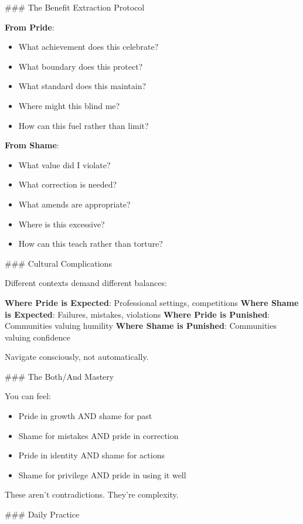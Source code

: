 \documentclass[12pt]{book}
\begin{document}
\#\#\# The Benefit Extraction Protocol

\textbf{From Pride}:
\begin{itemize}
\item What achievement does this celebrate?
\item What boundary does this protect?
\item What standard does this maintain?
\item Where might this blind me?
\item How can this fuel rather than limit?

\end{itemize}
\textbf{From Shame}:
\begin{itemize}
\item What value did I violate?
\item What correction is needed?
\item What amends are appropriate?
\item Where is this excessive?
\item How can this teach rather than torture?

\end{itemize}
\#\#\# Cultural Complications

Different contexts demand different balances:

\textbf{Where Pride is Expected}: Professional settings, competitions
\textbf{Where Shame is Expected}: Failures, mistakes, violations
\textbf{Where Pride is Punished}: Communities valuing humility
\textbf{Where Shame is Punished}: Communities valuing confidence

Navigate consciously, not automatically.

\#\#\# The Both/And Mastery

You can feel:
\begin{itemize}
\item Pride in growth AND shame for past
\item Shame for mistakes AND pride in correction
\item Pride in identity AND shame for actions
\item Shame for privilege AND pride in using it well

\end{itemize}
These aren't contradictions. They're complexity.

\#\#\# Daily Practice
\end{document}
